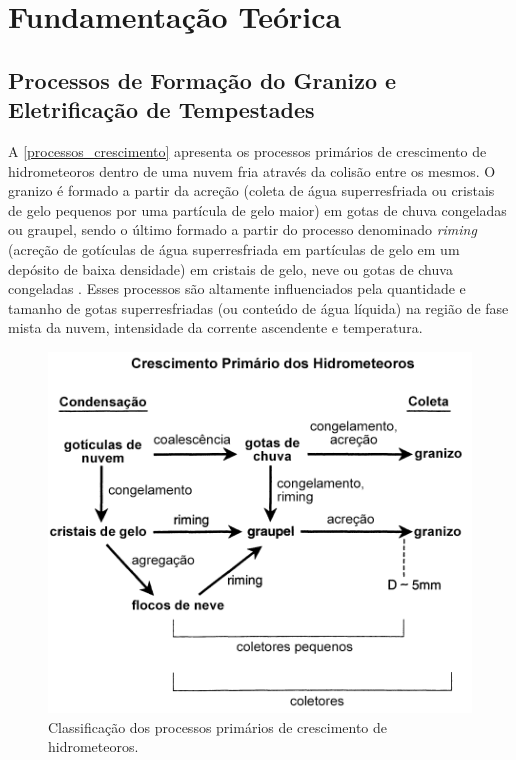 \chapter{Fundamentação Teórica}\label{teoria}

\section{Processos de Formação do Granizo e Eletrificação de Tempestades}\label{granizo_eletrificacao}

A \autoref{processos_crescimento} apresenta os processos primários de crescimento de hidrometeoros dentro de uma nuvem fria através da colisão entre os mesmos. O granizo é formado a partir da acreção (coleta de água superresfriada ou cristais de gelo pequenos por uma partícula de gelo maior) em gotas de chuva congeladas ou graupel, sendo o último formado a partir do processo denominado \textit{riming} (acreção de gotículas de água superresfriada em partículas de gelo em um depósito de baixa densidade) em cristais de gelo, neve ou gotas de chuva congeladas \cite{Reinking1975}. Esses processos são altamente influenciados pela quantidade e tamanho de gotas superresfriadas (ou conteúdo de água líquida) na região de fase mista da nuvem, intensidade da corrente ascendente e temperatura.

\vspace{\baselineskip}

\begin{figure}[htb]
	\begin{center}
		\caption{Classificação dos processos primários de crescimento de hidrometeoros.} 
		\label{processos_crescimento}
		\includegraphics[width=0.7\columnwidth]{figs/growth_knight_ptbr.png}
	\end{center}
\end{figure}

